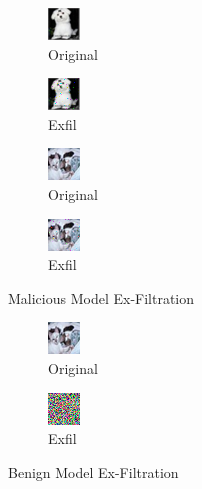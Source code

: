\begin{figure}
    \begin{subfigure}{.49\linewidth}
        \centering
        \includegraphics[scale=2]{graphics/M00_hdf5_original.png}
        \caption{Original}
        \label{subfig:M00-orig}
    \end{subfigure}
    \begin{subfigure}{.49\linewidth}
        \centering
        \includegraphics[scale=2]{graphics/M00_hdf5_exfil.png}
        \caption{Exfil}
        \label{subfig:M00-exfil}
    \end{subfigure}
    \begin{subfigure}{.49\linewidth}
        \centering
        \includegraphics[scale=2]{graphics/M01_hdf5_original.png}
        \caption{Original}
        \label{subfig:M01-orig}
    \end{subfigure}
    \begin{subfigure}{.49\linewidth}
        \centering
        \includegraphics[scale=2]{graphics/M01_hdf5_exfil.png}
        \caption{Exfil}
        \label{subfig:M01-exfil}
    \end{subfigure}
    \caption{Malicious Model Ex-Filtration}
    \label{fig:exfil-images}
\end{figure}

\begin{figure}
    \begin{subfigure}{.49\linewidth}
        \centering
        \includegraphics[scale=2]{graphics/G01_hdf5_original.png}
        \caption{Original}
        \label{subfig:G01-orig}
    \end{subfigure}
    \begin{subfigure}{.49\linewidth}
        \centering
        \includegraphics[scale=2]{graphics/G01_hdf5_exfil.png}
        \caption{Exfil}
        \label{fig:G01-exfil}
    \end{subfigure}
    \caption{Benign Model Ex-Filtration }
    \label{fig:un-exfil-images}
\end{figure}

